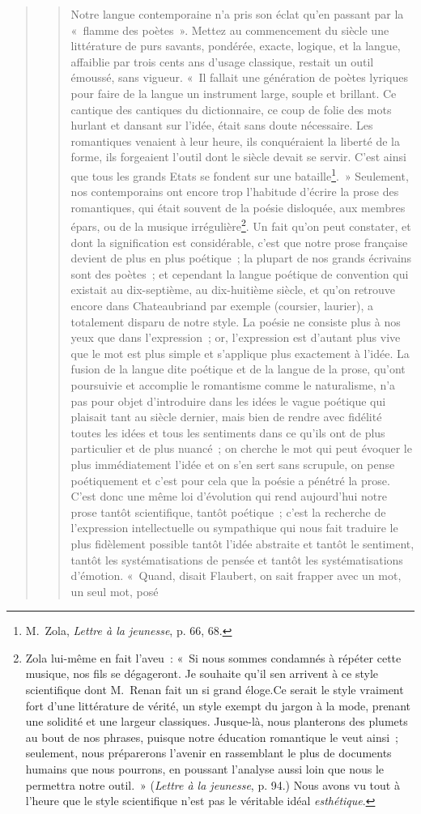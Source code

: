\documentclass[french,twoside]{book} %
\begin{document}
\begin{verse}
\begin{verse}
\noindent Notre langue contemporaine n’a pris son éclat qu’en passant par la « flamme des poètes ». Mettez au commencement du siècle une littérature de purs savants, pondérée, exacte, logique, et la langue, affaiblie par trois cents ans d’usage classique, restait un outil émoussé, sans vigueur. « Il fallait une génération de poètes lyriques pour faire de la langue un instrument large, souple et brillant. Ce cantique des cantiques du dictionnaire, ce coup de folie des mots hurlant et dansant sur l’idée, était sans doute nécessaire. Les romantiques venaient à leur heure, ils conquéraient la liberté de la forme, ils forgeaient l’outil dont le siècle devait se servir. C’est ainsi que tous les grands Etats se fondent sur une bataille\footnote{ M. Zola, \emph{Lettre à la jeunesse}, p. 66, 68.}. » Seulement, nos contemporains ont encore trop l’habitude d’écrire la prose des romantiques, qui était souvent de la poésie disloquée, aux membres épars, ou de la musique irrégulière\footnote{ Zola lui-même en fait l’aveu : « Si nous sommes condamnés à répéter cette musique, nos fils se dégageront. Je souhaite qu’il sen arrivent à ce style scientifique dont M. Renan fait un si grand éloge.Ce serait le style vraiment fort d’une littérature de vérité, un style exempt du jargon à la mode, prenant une solidité et une largeur classiques. Jusque-là, nous planterons des plumets au bout de nos phrases, puisque notre éducation romantique le veut ainsi ; seulement, nous préparerons l’avenir en rassemblant le plus de documents humains que nous pourrons, en poussant l’analyse aussi loin que nous le permettra notre outil. » (\emph{Lettre à la jeunesse}, p. 94.) Nous avons vu tout à l’heure que le style scientifique n’est pas le véritable idéal \emph{esthétique}.}. Un fait qu’on peut constater, et dont la signification est considérable, c’est que notre prose française devient de plus en plus poétique ; la plupart de nos grands écrivains sont des poètes ; et cependant la langue poétique de convention qui existait au dix-septième, au dix-huitième siècle, et qu’on retrouve encore dans Chateaubriand par exemple (coursier, laurier), a totalement disparu de notre style. La poésie ne consiste plus à nos yeux que dans l’expression ; or, l’expression est d’autant plus vive que le mot est plus simple et s’applique plus exactement à l’idée. La fusion de la langue dite poétique et de la langue de la prose, qu’ont poursuivie et accomplie le romantisme comme le naturalisme, n’a pas pour objet d’introduire dans les idées le vague poétique qui plaisait tant au siècle dernier, mais bien de rendre avec fidélité toutes les idées et tous les sentiments dans ce qu’ils ont de plus particulier et de plus nuancé ; on cherche le mot qui peut évoquer le plus immédiatement l’idée et on s’en sert sans scrupule, on pense poétiquement et c’est pour cela que la poésie a pénétré la prose. C’est donc une même loi d’évolution qui rend aujourd’hui notre prose tantôt scientifique, tantôt poétique ; c’est la recherche de l’expression intellectuelle ou sympathique qui nous fait traduire le plus fidèlement possible tantôt l’idée abstraite et tantôt le sentiment, tantôt les systématisations de pensée et tantôt les systématisations d’émotion. « Quand, disait Flaubert, on sait frapper avec un mot, un seul mot, posé 
\end{verse}
\end{verse}
\end{document}

